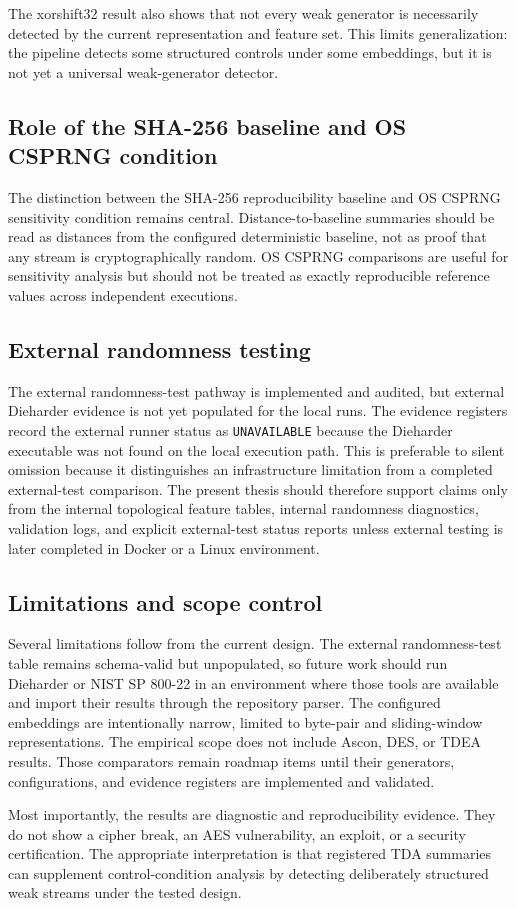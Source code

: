 The xorshift32 result also shows that not every weak generator is necessarily detected by the current representation and feature set. This limits generalization: the pipeline detects some structured controls under some embeddings, but it is not yet a universal weak-generator detector.

\subsection{Role of the SHA-256 baseline and OS CSPRNG condition}
\label{subsec:baseline-role}

The distinction between the SHA-256 reproducibility baseline and OS CSPRNG sensitivity condition remains central. Distance-to-baseline summaries should be read as distances from the configured deterministic baseline, not as proof that any stream is cryptographically random. OS CSPRNG comparisons are useful for sensitivity analysis but should not be treated as exactly reproducible reference values across independent executions.

\subsection{External randomness testing}
\label{subsec:external-testing-discussion}

The external randomness-test pathway is implemented and audited, but external Dieharder evidence is not yet populated for the local runs. The evidence registers record the external runner status as \texttt{UNAVAILABLE} because the Dieharder executable was not found on the local execution path. This is preferable to silent omission because it distinguishes an infrastructure limitation from a completed external-test comparison. The present thesis should therefore support claims only from the internal topological feature tables, internal randomness diagnostics, validation logs, and explicit external-test status reports unless external testing is later completed in Docker or a Linux environment.

\subsection{Limitations and scope control}
\label{subsec:limitations}

Several limitations follow from the current design. The external randomness-test table remains schema-valid but unpopulated, so future work should run Dieharder or NIST SP 800-22 in an environment where those tools are available and import their results through the repository parser. The configured embeddings are intentionally narrow, limited to byte-pair and sliding-window representations. The empirical scope does not include Ascon, DES, or TDEA results. Those comparators remain roadmap items until their generators, configurations, and evidence registers are implemented and validated.

Most importantly, the results are diagnostic and reproducibility evidence. They do not show a cipher break, an AES vulnerability, an exploit, or a security certification. The appropriate interpretation is that registered TDA summaries can supplement control-condition analysis by detecting deliberately structured weak streams under the tested design.

